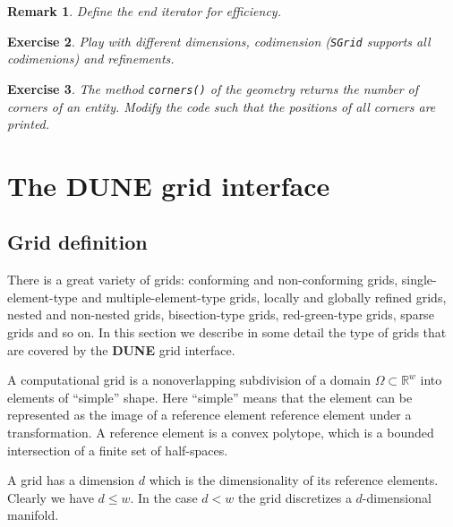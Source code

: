 \documentclass[11pt,a4paper,headinclude,footinclude,DIV16,normalheadings]{scrreprt}
\newcommand{\R}{\mathbb{R}}
\newcommand{\Dune}{{\sf\bfseries DUNE}\xspace}
\newtheorem{exc}{Exercise}[chapter]
\newtheorem{rem}[exc]{Remark}
\begin{document}
\begin{rem} Define the end iterator for efficiency. 
\end{rem}

\begin{exc} Play with different dimensions, codimension
  (\lstinline!SGrid! supports all codimenions) and refinements.
\end{exc}

\begin{exc} The method \lstinline!corners()! of the geometry returns
  the number of corners of an entity. Modify the code such that the
  positions of all corners are printed.
\end{exc}


\chapter{The \texorpdfstring{\Dune{}}{DUNE} grid interface}


\section{Grid definition}

There is a great variety of grids: conforming and non-conforming
grids, single-element-type and multiple-element-type grids, locally
and globally refined grids, nested and non-nested grids,
bisection-type grids, red-green-type grids, sparse grids and so on. In
this section we describe in some detail the type of grids that are
covered by the \Dune{} grid interface.


A computational grid is a nonoverlapping subdivision of a domain
$\Omega\subset\R^w$ into elements of ``simple'' shape. Here ``simple''
means that the element can be represented as the image of a reference
element reference element under a transformation. A reference element is a convex
polytope, which is a bounded intersection of a finite set of
half-spaces. 


A grid has a dimension $d$ which is the dimensionality of
its reference elements. Clearly we have $d\leq w$. In the case $d<w$ the grid
discretizes a $d$-dimensional manifold. 
\end{document}
